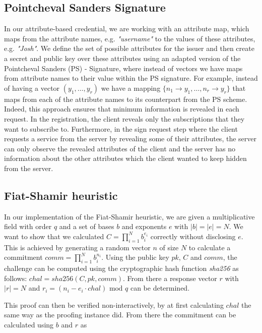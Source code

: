 \documentclass[9pt,conference]{IEEEtran}
\begin{document}
\subsection{Pointcheval Sanders Signature}
In our attribute-based credential, we are working with an attribute map, which maps from the attribute names, e.g. \textit{"username"} to the values of these attributes, e.g. \textit{"Josh"}. We define the set of possible attributes for the issuer and then create a secret and public key over these attributes using an adapted version of the Pointcheval Sanders (PS) - Signature\cite{pointcheval2016short}, where instead of vectors we have maps from attribute names to their value within the PS signature. For example, instead of having a vector $(y_1,\ldots, y_r)$ we have a mapping $\{n_1 \rightarrow y_1, \ldots, n_r \rightarrow y_r\}$ that maps from each of the attribute names to its counterpart from the PS scheme. Indeed, this approach ensures that minimum information is revealed in each request. In the registration, the client reveals only the subscriptions that they want to subscribe to. Furthermore, in the sign request step where the client requests a service from the server by revealing some of their attributes, the server can only observe the revealed attributes of the client and the server has no information about the other attributes which the client wanted to keep hidden from the server.

\subsection{Fiat-Shamir heuristic}
In our implementation of the Fiat-Shamir heuristic\cite{10.1007/3-540-47721-7_12}, we are given a multiplicative field with order $q$ and a set of bases $b$ and exponents $e$ with ${|b| = |e| = N}$. We want to show that we calculated ${C = \prod_{i=1}^{N}{b_i^{e_i}}}$ correctly without disclosing $e$. This is achieved by generating a random vector $n$ of size $N$ to calculate a commitment ${comm = \prod_{i=1}^{N}{b_i^{n_i}}}$. Using the public key $pk$, $C$ and $comm$, the challenge can be computed using the cryptographic hash function \textit{sha256} as follows: ${chal = sha256(C, pk, comm)}$. From there a response vector $r$ with $|r| = N$ and ${r_i = (n_i - e_i \cdot chal) \text{ mod } q}$ can be determined.

This proof can then be verified non-interactively, by at first calculating $chal$ the same way as the proofing instance did. From there the commitment can be calculated using $b$ and $r$ as
\end{document}
